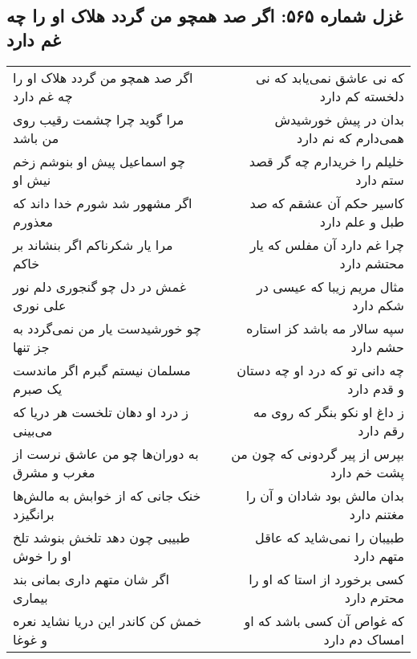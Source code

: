 \begin{center}
\section*{غزل شماره ۵۶۵: اگر صد همچو من گردد هلاک او را چه غم دارد}
\label{sec:0565}
\begin{longtable}{l p{0.5cm} r}
اگر صد همچو من گردد هلاک او را چه غم دارد
&&
که نی عاشق نمی‌یابد که نی دلخسته کم دارد
\\
مرا گوید چرا چشمت رقیب روی من باشد
&&
بدان در پیش خورشیدش همی‌دارم که نم دارد
\\
چو اسماعیل پیش او بنوشم زخم نیش او
&&
خلیلم را خریدارم چه گر قصد ستم دارد
\\
اگر مشهور شد شورم خدا داند که معذورم
&&
کاسیر حکم آن عشقم که صد طبل و علم دارد
\\
مرا یار شکرناکم اگر بنشاند بر خاکم
&&
چرا غم دارد آن مفلس که یار محتشم دارد
\\
غمش در دل چو گنجوری دلم نور علی نوری
&&
مثال مریم زیبا که عیسی در شکم دارد
\\
چو خورشیدست یار من نمی‌گردد به جز تنها
&&
سپه سالار مه باشد کز استاره حشم دارد
\\
مسلمان نیستم گبرم اگر ماندست یک صبرم
&&
چه دانی تو که درد او چه دستان و قدم دارد
\\
ز درد او دهان تلخست هر دریا که می‌بینی
&&
ز داغ او نکو بنگر که روی مه رقم دارد
\\
به دوران‌ها چو من عاشق نرست از مغرب و مشرق
&&
بپرس از پیر گردونی که چون من پشت خم دارد
\\
خنک جانی که از خوابش به مالش‌ها برانگیزد
&&
بدان مالش بود شادان و آن را مغتنم دارد
\\
طبیبی چون دهد تلخش بنوشد تلخ او را خوش
&&
طبیبان را نمی‌شاید که عاقل متهم دارد
\\
اگر شان متهم داری بمانی بند بیماری
&&
کسی برخورد از استا که او را محترم دارد
\\
خمش کن کاندر این دریا نشاید نعره و غوغا
&&
که غواص آن کسی باشد که او امساک دم دارد
\\
\end{longtable}
\end{center}
